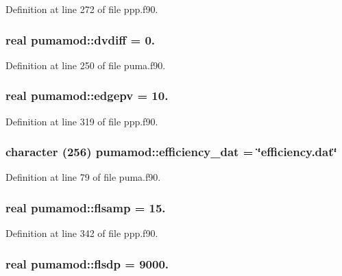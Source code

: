 \-Definition at line 272 of file ppp.\-f90.

\hypertarget{classpumamod_a529184e9404faf138c07e7f28afee2e1}{
\subsubsection[{dvdiff}]{\setlength{\rightskip}{0pt plus 5cm}real {\bf pumamod\-::dvdiff} = 0.}}
\label{classpumamod_a529184e9404faf138c07e7f28afee2e1}


\-Definition at line 250 of file puma.\-f90.

\hypertarget{classpumamod_a69b908f8d7731d272c19d329fcd33706}{
\subsubsection[{edgepv}]{\setlength{\rightskip}{0pt plus 5cm}real {\bf pumamod\-::edgepv} = 10.}}
\label{classpumamod_a69b908f8d7731d272c19d329fcd33706}


\-Definition at line 319 of file ppp.\-f90.

\hypertarget{classpumamod_a5f70e9c47b9e4690322963b92bb809de}{
\subsubsection[{efficiency\-\_\-dat}]{\setlength{\rightskip}{0pt plus 5cm}character (256) {\bf pumamod\-::efficiency\-\_\-dat} = \char`\"{}efficiency.\-dat\char`\"{}}}
\label{classpumamod_a5f70e9c47b9e4690322963b92bb809de}


\-Definition at line 79 of file puma.\-f90.

\hypertarget{classpumamod_a3989013e6e41db4fe84fe588114e3298}{
\subsubsection[{flsamp}]{\setlength{\rightskip}{0pt plus 5cm}real {\bf pumamod\-::flsamp} = 15.}}
\label{classpumamod_a3989013e6e41db4fe84fe588114e3298}


\-Definition at line 342 of file ppp.\-f90.

\hypertarget{classpumamod_a51e58c7fbc975478f8dbe96463b3a433}{
\subsubsection[{flsdp}]{\setlength{\rightskip}{0pt plus 5cm}real {\bf pumamod\-::flsdp} = 9000.}}
\label{classpumamod_a51e58c7fbc975478f8dbe96463b3a433}


